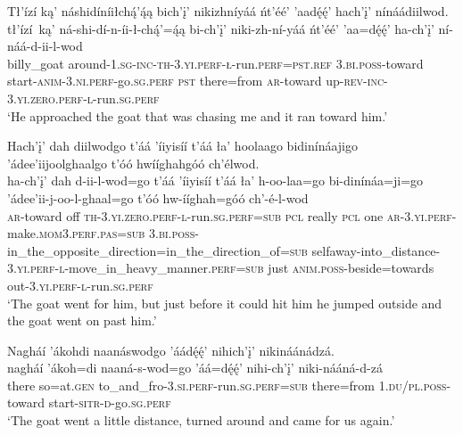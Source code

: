 \ea\label{ex:text6-8-7}
Tł’ízí ką’ náshidíníiłchą́’ą́ą bich’į’ nikizhníyáá ńt’éé’ ’aadę́ę́’ hach’į’ nínáádiilwod.\\
\gll tł’ízí~{ką’}	ná-shi-dí-n-íi-ł-chą́’=ą́ą	bi-ch’į’	niki-zh-ní-yáá	ńt’éé’	’aa=dę́ę́’	ha-ch’į’	ní-náá-d-ii-l-wod\\
     billy\_goat	around-1.\textsc{sg}-\textsc{inc}-\textsc{th}-3.\textsc{yi}.\textsc{perf}-\textsc{ł}-run.\textsc{perf}=\textsc{pst}.\textsc{ref}	3.\textsc{bi}.\textsc{poss}-toward	start-\textsc{anim}-3.\textsc{ni}.\textsc{perf}-go.\textsc{sg}.\textsc{perf}	\textsc{pst}	there=from	\textsc{ar}-toward	up-\textsc{rev}-\textsc{inc}-3.\textsc{yi}.\textsc{zero}.\textsc{perf}-\textsc{l}-run.\textsc{sg}.\textsc{perf}\\
\glt `He approached the goat that was chasing me and it ran toward him.'
\z

\ea\label{ex:text6-8-8}
Hach’į’ dah diilwodgo t’áá ’íiyisíí t’áá ła’ hoolaago bidinínáajigo ’ádee’iijoolghaalgo t’óó hwííghahgóó ch’élwod.\\
\gll ha-ch’į’	dah	d-ii-l-wod=go	t’áá	’íiyisíí	t’áá	ła’	h-oo-laa=go	bi-dinínáa=ji=go	’ádee’ii-j-oo-l-ghaal=go	t’óó	hw-ííghah=góó	ch’-é-l-wod\\
     \textsc{ar}-toward	off	\textsc{th}-3.\textsc{yi}.\textsc{zero}.\textsc{perf}-\textsc{l}-run.\textsc{sg}.\textsc{perf}=\textsc{sub}	\textsc{pcl}	really	\textsc{pcl}	one	\textsc{ar}-3.\textsc{yi}.\textsc{perf}-make.\textsc{mom}3.\textsc{perf}.\textsc{pas}=\textsc{sub}	3.\textsc{bi}.\textsc{poss}-in\_the\_opposite\_direction=in\_the\_direction\_of=\textsc{sub}	selfaway-into\_distance-3.\textsc{yi}.\textsc{perf}-\textsc{l}-move\_in\_heavy\_manner.\textsc{perf}=\textsc{sub}	just	\textsc{anim}.\textsc{poss}-beside=towards	out-3.\textsc{yi}.\textsc{perf}-\textsc{l}-run.\textsc{sg}.\textsc{perf}\\
\glt `The goat went for him, but just before it could hit him he jumped outside and the goat went on past him.'
\z

\ea\label{ex:text6-8-9}
Nagháí ’ákohdi naanáswodgo ’áádę́ę́’ nihich’į’ nikináánádzá.\\
\gll nagháí	’ákoh=di	naaná-s-wod=go	’áá=dę́ę́’	nihi-ch’į’	niki-nááná-d-zá\\
     there	so=at.\textsc{gen}	to\_and\_fro-3.\textsc{si}.\textsc{perf}-run.\textsc{sg}.\textsc{perf}=\textsc{sub}	there=from	1.\textsc{du}/\textsc{pl}.\textsc{poss}-toward	start-\textsc{sitr}-\textsc{d}-go.\textsc{sg}.\textsc{perf}\\
\glt `The goat went a little distance, turned around and came for us again.'
\z

